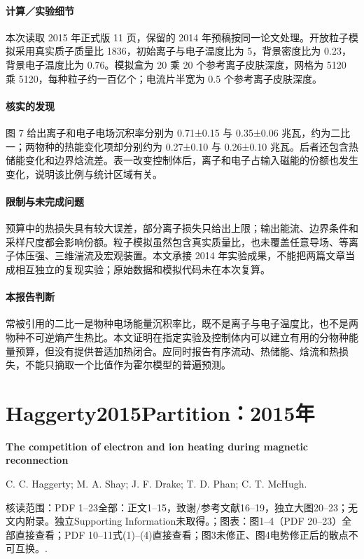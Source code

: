 \documentclass[UTF8,a4paper,11pt,openany,fontset=fandol]{ctexbook}
\begin{document}
\paragraph{计算／实验细节}本次读取 2015 年正式版 11 页，保留的 2014 年预稿按同一论文处理。开放粒子模拟采用真实质子质量比 1836，初始离子与电子温度比为 5，背景密度比为 0.23，背景电子温度比为 0.76。模拟盒为 20 乘 20 个参考离子皮肤深度，网格为 5120 乘 5120，每种粒子约一百亿个；电流片半宽为 0.5 个参考离子皮肤深度。

\paragraph{核实的发现}图 7 给出离子和电子电场沉积率分别为 0.71±0.15 与 0.35±0.06 兆瓦，约为二比一；两物种的热能变化项却分别约为 0.27±0.10 与 0.26±0.10 兆瓦。后者还包含热储能变化和边界焓流差。表一改变控制体后，离子和电子占输入磁能的份额也发生变化，说明该比例与统计区域有关。

\paragraph{限制与未完成问题}预算中的热损失具有较大误差，部分离子损失只给出上限；输出能流、边界条件和采样尺度都会影响份额。粒子模拟虽然包含真实质量比，也未覆盖任意导场、等离子体压强、三维湍流及宏观装置。本文承接 2014 年实验成果，不能把两篇文章当成相互独立的复现实验；原始数据和模拟代码未在本次复算。

\paragraph{本报告判断}常被引用的二比一是物种电场能量沉积率比，既不是离子与电子温度比，也不是两物种不可逆熵产生热比。本文证明在指定实验及控制体内可以建立有用的分物种能量预算，但没有提供普适加热闭合。应同时报告有序流动、热储能、焓流和热损失，不能只摘取一个比值作为霍尔模型的普遍预测。

\section{Haggerty2015Partition：2015年}\label{paper:Haggerty2015Partition}

\textbf{The competition of electron and ion heating during magnetic reconnection}\citep{Haggerty2015Partition}\

C. C. Haggerty;  M. A. Shay;  J. F. Drake;  T. D. Phan;  C. T. McHugh.

\textsf{核读范围：}PDF 1–23全部：正文1–15，致谢/参考文献16–19，独立大图20–23；无文内附录。独立Supporting Information未取得。；\textsf{图表：}图1–4（PDF 20–23）全部直接查看；PDF 10–11式(1)–(4)直接查看；图3未修正、图4电势修正后的散点不可互换。.
\end{document}
